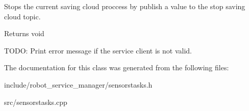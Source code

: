 Stops the current saving cloud proccess by publish a value to the stop saving cloud topic. 

\begin{DoxyReturn}{Returns}
void 
\end{DoxyReturn}
T\+O\+DO\+: Print error message if the service client is not valid.

The documentation for this class was generated from the following files\+:\begin{DoxyCompactItemize}
\item 
include/robot\+\_\+service\+\_\+manager/sensorstasks.\+h\item 
src/sensorstasks.\+cpp\end{DoxyCompactItemize}
